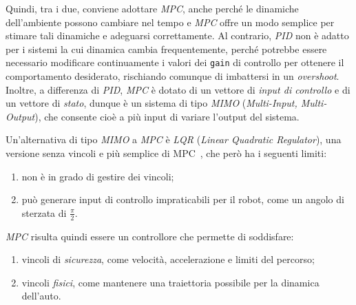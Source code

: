 Quindi, tra i due, conviene adottare \textit{MPC}, anche perché le dinamiche dell’ambiente
possono cambiare nel tempo e \textit{MPC} offre un modo semplice per stimare tali dinamiche e 
adeguarsi correttamente. Al contrario, \textit{PID} non è adatto per i sistemi la cui
dinamica cambia frequentemente, perché potrebbe essere necessario modificare 
continuamente i valori dei \verb|gain| di controllo per ottenere il comportamento
desiderato, rischiando comunque di imbattersi in un \textit{overshoot}.
Inoltre, a differenza di \textit{PID}, \textit{MPC} è dotato di un vettore di 
\textit{input di controllo} e di un vettore di \textit{stato}, dunque è un sistema di tipo 
\textit{MIMO} (\textit{Multi-Input, Multi-Output}), che consente cioè a più input di variare l’output del sistema.

Un'alternativa di tipo \textit{MIMO} a \textit{MPC} è \textit{LQR} 
(\textit{Linear Quadratic Regulator}), una versione senza vincoli 
e più semplice di MPC~\cite{f1tenthcoursel13}, che però ha i seguenti limiti:
\begin{enumerate}
    \item non è in grado di gestire dei vincoli;
    \item può generare input di controllo impraticabili per il robot, come un angolo di sterzata di $\frac{\pi}{2}$.
\end{enumerate}
\textit{MPC} risulta quindi essere un controllore che permette di soddisfare:
 \begin{enumerate}
     \item vincoli di \textit{sicurezza}, come velocità, accelerazione e limiti del percorso;
     \item vincoli \textit{fisici}, come mantenere una traiettoria possibile per la dinamica dell'auto.
 \end{enumerate}


